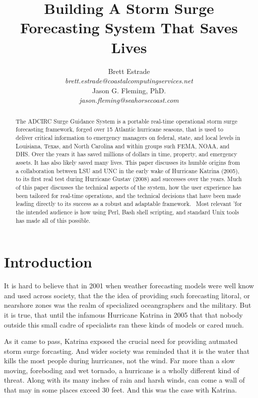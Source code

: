 \documentclass{article}
\title{Building A Storm Surge Forecasting System That Saves Lives}
\author{
Brett Estrade \\
\large\textit{brett.estrade@coastalcomputingservices.net}
\\
Jason G. Fleming, PhD. \\
\large\textit{jason.fleming@seahorsecoast.com}
}
\begin{document}
\maketitle

\begin{abstract}
The ADCIRC Surge Guidance System is a portable real-time operational storm surge
forecasting framework, forged over 15 Atlantic hurricane seasons, that is used
to deliver critical information to emergency managers on federal, state, and
local levels in Louisiana, Texas, and North Carolina and within groups such
FEMA, NOAA, and DHS. Over the years it has saved millions of dollars in time,
property, and emergency assets. It has also likely saved many lives. This paper
discusses its humble origins from a collaboration between LSU and UNC in the
early wake of Hurricane Katrina (2005), to its first real test during Hurricane
Gustav (2008) and successes over the years. Much of this paper discusses the
technical aspects of the system, how the user experience has been tailored for
real-time operations, and the technical decisions that have been made leading
directly to its success as a robust and adaptable framework.  Most relevant 'for
the intended audience is how using Perl, Bash shell scripting, and standard Unix
tools has made all of this possible.
\end{abstract}

\section{Introduction}

It is hard to believe that in 2001 when weather forecasting models were well
know and used across society, that the the idea of providing such forecasting
litoral, or nearshore zones was the realm of specialized oceangraphers and the
military. But it is true, that until the infamous Hurricane Katrina in 2005 that
that nobody outside this small cadre of specialists ran these kinds of models or
cared much.

As it came to pass, Katrina exposed the crucial need for providing autmated
storm surge forcasting. And wider society was reminded that it is the water that
kills the most people during hurricanes, not the wind. Far more than a slow
moving, foreboding and wet tornado, a hurricane is a wholly different kind of
threat. Along with its many inches of rain and harsh winds, can come a wall of
that may in some places exceed 30 feet. And this was the case with Katrina.
\end{document}
